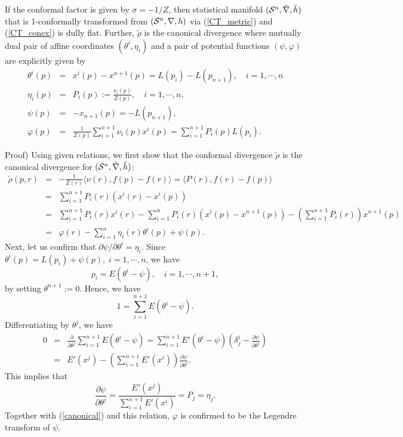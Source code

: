 \documentclass{llncs}
\begin{document}
\begin{proposition}
\label{prop:1}
If the conformal factor is given by $\sigma=-1/Z$, 
then statistical manifold $({\cal S}^n,\tilde \nabla, \tilde h)$ 
that is 1-conformally transformed from $({\cal S}^n,\nabla,h)$ 
via (\ref{CT_metric}) and (\ref{CT_conex}) is dully flat.
Further, $\tilde \rho$ is the canonical divergence 
where mutually dual pair of affine coordinates $(\theta^i, \eta_i)$ 
and a pair of potential functions $(\psi, \varphi)$ are explicitly given by
\begin{eqnarray}
	\theta^i(p) &=& x^i(p)-x^{n+1}(p)=L(p_i)-L(p_{n+1}), \quad i=1,\cdots,n \\
	\eta_i(p) &=& P_i(p):=\frac{\nu_i(p)}{Z(p)}, \quad i=1,\cdots,n, \\
	\psi(p) &=& -x_{n+1}(p)=-L(p_{n+1}), \\
	\varphi(p) &=& \frac{1}{Z(p)} \sum_{i=1}^{n+1} \nu_i(p)x^i(p)
			= \sum_{i=1}^{n+1} P_i(p)L(p_i).
\end{eqnarray}
\end{proposition}
Proof)
Using given relations, we first show that the conformal divergence 
$\tilde \rho$ is the canonical divergence for 
$({\cal S}^n,\tilde \nabla, \tilde h)$:
\begin{eqnarray}
	\tilde \rho(p,r)&=& 
		-\frac{1}{Z(r)} \langle \nu(r), f(p) - f(r) \rangle
		= \langle P(r), f(r) - f(p) \rangle \nonumber \\
	&=& \sum_{i=1}^{n+1} P_i(r)(x^i(r) - x^i(p)) \nonumber \\
	&=& \sum_{i=1}^{n+1} P_i(r)x^i(r) 
		- \sum_{i=1}^{n} P_i(r)(x^i(p) - x^{n+1}(p))
		- \left(\sum_{i=1}^{n+1} P_i(r) \right)x^{n+1}(p) \nonumber \\
	&=& \varphi(r) - \sum_{i=1}^{n} \eta_i(r) \theta^i(p) + \psi(p).
\label{canonical}
\end{eqnarray}
Next, let us confirm that  
$\partial \psi/\partial \theta^i = \eta_i$.
Since $\theta^i(p)=L(p_i)+\psi(p), \; i=1,\cdots,n$, we have
\[
	p_i=E(\theta^i-\psi), \quad i=1,\cdots,n+1,
\]
by setting $\theta^{n+1}:=0$.
Hence, we have 
\[
	1= \sum_{i=1}^{n+1} E(\theta^i-\psi).
\]
Differentiating by $\theta^j$, we have
\begin{eqnarray*}
	0&=& \frac{\partial}{\partial \theta^j} 
			\sum_{i=1}^{n+1} E(\theta^i-\psi)
	=\sum_{i=1}^{n+1} E'(\theta^i-\psi) \left( \delta^i_j- 
		\frac{\partial \psi}{\partial \theta^j} \right) \\
	&=& E'(x^j) - \left( \sum_{i=1}^{n+1} E'(x^i) \right)
				\frac{\partial \psi}{\partial \theta^j}.
\end{eqnarray*}
This implies that
\[
	\frac{\partial \psi}{\partial \theta^j}
	=\frac{E'(x^j)}{\sum_{i=1}^{n+1} E'(x^i)}=P_j=\eta_j.
\]
Together with (\ref{canonical}) and this relation, 
$\varphi$ is confirmed to be the Legendre transform of $\psi$.
\end{document}
